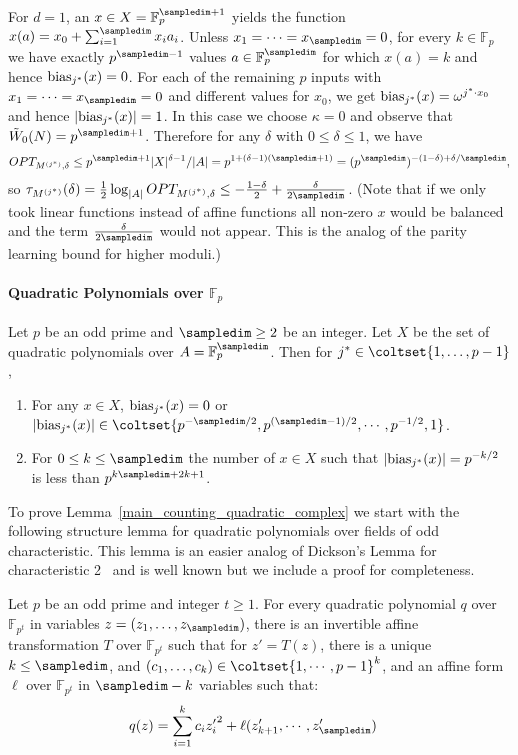For $d=1$, an $x\in X=\mathbb{F}_p^{\sampledim+1}$ yields the function
$x(a)=x_0+\sum_{i=1}^\sampledim x_i a_i$.  Unless $x_1=\cdots=x_\sampledim=0$, for every 
$k\in \mathbb{F}_p$ we have exactly $p^{\sampledim-1}$ values $a\in \mathbb{F}_p^\sampledim$
for which $x(a)=k$ and hence $\mathrm{bias}_{j^*}(x)=0$.
For each of the remaining $p$ inputs with $x_1=\cdots=x_\sampledim=0$
and different values for $x_0$, we get $\mathrm{bias}_{j^*}(x)=\omega^{j^*\cdot x_0}$
and hence $|\mathrm{bias}_{j^*}(x)|=1$.
In this case we choose $\kappa=0$ and observe that $\tilde W_0(N)=p^{\sampledim+1}$.
Therefore for any $\delta$ with $0\le \delta\le 1$, we have
$$OPT_{\mjs,\delta}\le p^{\sampledim+1} |X|^{\delta-1}/|A|=p^{1+(\delta-1)(\sampledim+1)}=(p^\sampledim)^{-(1-\delta)+\delta/\sampledim},$$
so $\tau_{\mjs}(\delta)=\frac12 \log_{|A|} OPT_{\mjs,\delta}\le -\frac{1-\delta}2+\frac{\delta}{2\sampledim}$.
(Note that if we only took linear functions instead of affine functions
all non-zero $x$ would be balanced and the term $\frac{\delta}{2\sampledim}$ would not
appear. This is the analog of the parity learning bound for higher moduli.)

\paragraph{Quadratic Polynomials over $\mathbb{F}_p$}


\begin{lemma}\label{main_counting_quadratic_complex}
Let $p$ be an odd prime and $\sampledim\ge 2$ be an integer.
Let $X$ be the set of quadratic polynomials over $A=\mathbb{F}_p^\sampledim$.
Then for $j^*\in \coltset{1,\ldots,p-1}$,
\begin{enumerate}
\item For any $x\in X$,  $\mathrm{bias}_{j^*}(x)=0$ or $|\biasjs(x)|\in \coltset{p^{-\sampledim/2},p^{(\sampledim-1)/2},\cdots, p^{-1/2},1}$.
\item For $0\le k\le \sampledim$ the number of $x\in X$ such that
$|\mathrm{bias}_{j^*}(x)|=p^{-k/2}$ is less than $p^{k\sampledim+2k+1}$.
\end{enumerate}
\end{lemma}

To prove Lemma~\ref{main_counting_quadratic_complex} we start with the
following structure lemma for quadratic polynomials
over fields of odd characteristic.  This lemma is an easier analog of
Dickson's Lemma for characteristic 2~\citep{dickson:book} and is well
known but we include a proof for completeness.

\begin{lemma}\label{lem:structure-quadratic}
Let $p$ be an odd prime and integer $t\ge 1$.
For every quadratic polynomial $q$ over $\mathbb{F}_{p^t}$ 
in variables $z=(z_1,\ldots, z_\sampledim)$,
there is an invertible affine transformation $T$ over $\mathbb{F}_{p^t}$ such
that for $z'=T(z)$,
there is a unique $k\le \sampledim$, and $(c_1,\ldots,c_k)\in \coltset{1,\cdots,p-1}^k$,
and an affine form $\ell$ over $\mathbb{F}_{p^t}$ 
in $\sampledim-k$ variables such that:
\begin{align*}
q(z)&=\sum_{i=1}^k c_i{z'_i}^2+\ell(z'_{k+1},\cdots,z'_\sampledim)
\end{align*}
\end{lemma}

